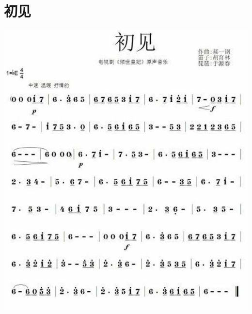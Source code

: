\documentclass[cn,pad,chinese,chinesefont=nofont]{elegantbook}
\begin{document}
\section{初见}
    \includegraphics[width=\textwidth]{dongxiao/2020323初见.jpg}
\end{document}
